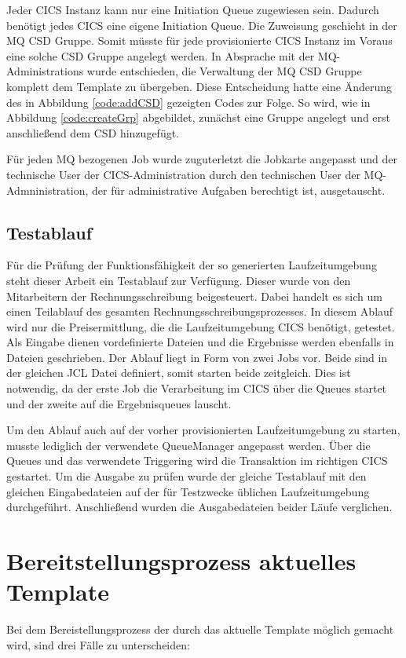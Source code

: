 Jeder CICS Instanz kann nur eine Initiation Queue zugewiesen sein.
Dadurch benötigt jedes CICS eine eigene Initiation Queue.
Die Zuweisung geschieht in der MQ CSD Gruppe.
Somit müsste für jede provisionierte CICS Instanz im Voraus eine solche CSD Gruppe angelegt werden.
In Absprache mit der MQ-Administrations  wurde entschieden, die Verwaltung der MQ CSD Gruppe komplett dem Template zu übergeben.
Diese Entscheidung hatte eine Änderung des in Abbildung \ref{code:addCSD} gezeigten Codes zur Folge.
So wird, wie in Abbildung \ref{code:createGrp} abgebildet, zunächst eine Gruppe angelegt und erst anschließend dem CSD hinzugefügt.

Für jeden MQ bezogenen Job wurde zuguterletzt die Jobkarte angepasst und der technische User der CICS-Administration durch den technischen User der MQ-Admninistration, der für administrative Aufgaben berechtigt ist, ausgetauscht.

\subsection{Testablauf}
Für die Prüfung der Funktionsfähigkeit der so generierten Laufzeitumgebung steht dieser Arbeit ein Testablauf zur Verfügung.
Dieser wurde von den Mitarbeitern der Rechnungsschreibung beigesteuert.
Dabei handelt es sich um einen Teilablauf des gesamten Rechnungsschreibungsprozesses.
In diesem Ablauf wird nur die Preisermittlung, die die Laufzeitumgebung CICS benötigt, getestet.
Als Eingabe dienen vordefinierte Dateien und die Ergebnisse werden ebenfalls in Dateien geschrieben.
Der Ablauf liegt in Form von zwei Jobs vor.
Beide sind in der gleichen JCL Datei definiert, somit starten beide zeitgleich.
Dies ist notwendig, da der erste Job die Verarbeitung im CICS über die Queues startet und der zweite auf die Ergebnisqueues lauscht.

Um den Ablauf auch auf der vorher provisionierten Laufzeitumgebung zu starten, musste lediglich der verwendete QueueManager angepasst werden.
Über die Queues und das verwendete Triggering wird die Transaktion im richtigen CICS gestartet.
Um die Ausgabe zu prüfen wurde der gleiche Testablauf mit den gleichen Eingabedateien auf der für Testzwecke üblichen Laufzeitumgebung durchgeführt.
Anschließend wurden die Ausgabedateien beider Läufe verglichen.

\section{Bereitstellungsprozess aktuelles Template}\label{sec:akttemp}
Bei dem Bereistellungsprozess der durch das aktuelle Template möglich gemacht wird, sind drei Fälle zu unterscheiden:

